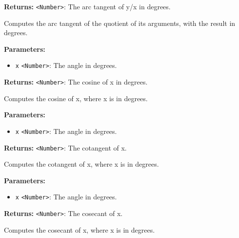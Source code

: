 \documentclass[12pt,a4paper]{article}
\begin{document}
\noindent \textbf{Returns:} \texttt{<Number>}: The arc tangent of y/x in degrees.

\noindent Computes the arc tangent of the quotient of its arguments, with the result in degrees.

\vspace{5mm}
\noindent {}


\noindent \textbf{Parameters:}
\begin{itemize}
  \item \texttt{x} \texttt{<Number>}: The angle in degrees.
\end{itemize}

\noindent \textbf{Returns:} \texttt{<Number>}: The cosine of x in degrees.

\noindent Computes the cosine of x, where x is in degrees.

\vspace{5mm}
\noindent {}


\noindent \textbf{Parameters:}
\begin{itemize}
  \item \texttt{x} \texttt{<Number>}: The angle in degrees.
\end{itemize}

\noindent \textbf{Returns:} \texttt{<Number>}: The cotangent of x.

\noindent Computes the cotangent of x, where x is in degrees.

\vspace{5mm}
\noindent {}


\noindent \textbf{Parameters:}
\begin{itemize}
  \item \texttt{x} \texttt{<Number>}: The angle in degrees.
\end{itemize}

\noindent \textbf{Returns:} \texttt{<Number>}: The cosecant of x.

\noindent Computes the cosecant of x, where x is in degrees.

\vspace{5mm}
\noindent {}
\end{document}
